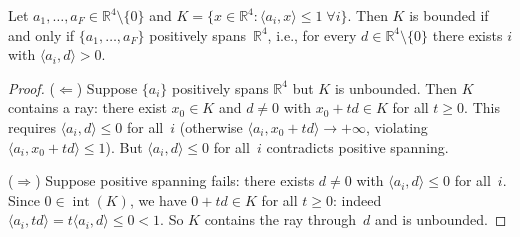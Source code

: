
\begin{unverified}
\begin{lemma}\label{lem:positive-span}
Let $a_1, \ldots, a_F \in \mathbb{R}^4 \setminus \{0\}$ and
$K = \{x \in \mathbb{R}^4 : \langle a_i, x \rangle \leq 1 \;\forall i\}$.
Then $K$ is bounded if and only if $\{a_1, \ldots, a_F\}$ positively
spans~$\mathbb{R}^4$, i.e., for every $d \in \mathbb{R}^4 \setminus \{0\}$
there exists $i$ with $\langle a_i, d \rangle > 0$.
\end{lemma}

\begin{proof}
($\Leftarrow$) Suppose $\{a_i\}$ positively spans $\mathbb{R}^4$ but $K$ is
unbounded. Then $K$ contains a ray: there exist $x_0 \in K$ and
$d \neq 0$ with $x_0 + t d \in K$ for all $t \geq 0$. This requires
$\langle a_i, d \rangle \leq 0$ for all~$i$ (otherwise
$\langle a_i, x_0 + td \rangle \to +\infty$, violating
$\langle a_i, x_0 + td \rangle \leq 1$). But $\langle a_i, d \rangle \leq 0$
for all~$i$ contradicts positive spanning. \contradiction

($\Rightarrow$) Suppose positive spanning fails: there exists
$d \neq 0$ with $\langle a_i, d \rangle \leq 0$ for all~$i$.
Since $0 \in \operatorname{int}(K)$, we have $0 + td \in K$ for all
$t \geq 0$: indeed $\langle a_i, td \rangle = t\langle a_i, d\rangle \leq 0 < 1$.
So $K$ contains the ray through~$d$ and is unbounded.
\end{proof}
\end{unverified}


